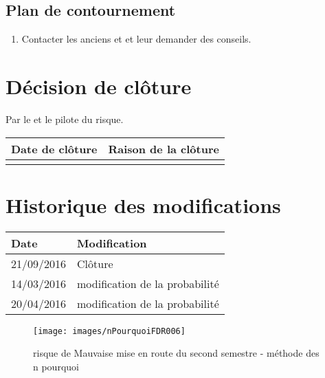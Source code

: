 \flushleft
\subsection*{Plan de contournement}

\begin{enumerate}
	\item Contacter les anciens \CP{} et \RQ{} et leur demander des conseils.
\end{enumerate}

\section*{Décision de clôture}
Par le \CP{} et le pilote du risque.
\begin{table}[H]
\centering
	\begin{tabularx}{16.8cm}{|X|X|}
	\hline
	\rowcolor{gray!40} Date de clôture & Raison de la clôture \\
	\hline
	  & \\
	\hline
	\end{tabularx}
\end{table}

\section*{Historique des modifications}
\begin{table}[H]
\centering
	\begin{tabularx}{16.8cm}{|X|X|}
	\hline
	Date & Modification \\
	\hline
	 21/09/2016 & Clôture \\
	\hline
	 14/03/2016 & modification de la probabilité \\
	\hline
	 20/04/2016 & modification de la probabilité \\
	\hline
	
	\end{tabularx}
\end{table}
\newpage

\begin{landscape}
\begin{figure}
	\centering
	\texttt{[image: images/nPourquoiFDR006]}
	\caption{\label{risque Mauvaise mise en route du second semestre}risque de Mauvaise mise en route du second semestre - méthode des n pourquoi}
\end{figure}
\end{landscape}
